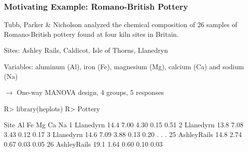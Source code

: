 \begin{frame}[containsverbatim]
	\frametitle{Motivating Example: Romano-British Pottery}

  Tubb, Parker \& Nicholson 
	analyzed the chemical composition of 26 samples of Romano-British
	pottery found at four kiln sites in Britain.
	\begin{itemize*}
		\item Sites: Ashley Rails, Caldicot, Isle of Thorns, Llanedryn
		\item Variables: aluminum (Al), iron (Fe), magnesium (Mg),
	calcium (Ca) and sodium (Na)
		\item $\rightarrow$ One-way MANOVA design, 4 groups, 5 responses
	\end{itemize*}
	
\begin{CodeInput}
R> library(heplots)
R> Pottery
\end{CodeInput}
\begin{CodeOutput}
          Site   Al   Fe   Mg   Ca   Na
1    Llanedyrn 14.4 7.00 4.30 0.15 0.51
2    Llanedyrn 13.8 7.08 3.43 0.12 0.17
3    Llanedyrn 14.6 7.09 3.88 0.13 0.20
 . . .
25 AshleyRails 14.8 2.74 0.67 0.03 0.05
26 AshleyRails 19.1 1.64 0.60 0.10 0.03
\end{CodeOutput} 

\end{frame}

